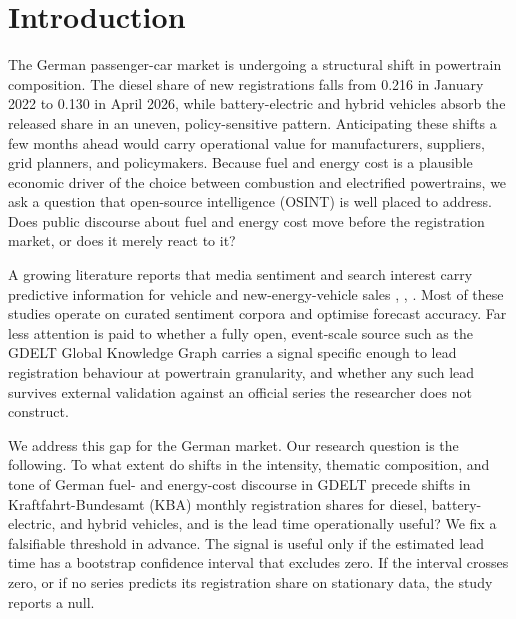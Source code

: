 \documentclass[conference]{IEEEtran}
\begin{document}
\section{Introduction}
The German passenger-car market is undergoing a structural shift in powertrain
composition. The diesel share of new registrations falls from 0.216 in January
2022 to 0.130 in April 2026, while battery-electric and hybrid vehicles absorb
the released share in an uneven, policy-sensitive pattern. Anticipating these
shifts a few months ahead would carry operational value for manufacturers,
suppliers, grid planners, and policymakers. Because fuel and energy cost is a
plausible economic driver of the choice between combustion and electrified
powertrains, we ask a question that open-source intelligence (OSINT) is well
placed to address. Does public discourse about fuel and energy cost move before
the registration market, or does it merely react to it?

A growing literature reports that media sentiment and search interest carry
predictive information for vehicle and new-energy-vehicle sales
\cite{wijnhoven2017}, \cite{shao2025}, \cite{liu2025}. Most of these studies
operate on curated sentiment corpora and optimise forecast accuracy. Far less
attention is paid to whether a fully open, event-scale source such as the GDELT
Global Knowledge Graph \cite{gdelt2013} carries a signal specific enough to lead
registration behaviour at powertrain granularity, and whether any such lead
survives external validation against an official series the researcher does not
construct.

We address this gap for the German market. Our research question is the
following. To what extent do shifts in the intensity, thematic composition, and
tone of German fuel- and energy-cost discourse in GDELT precede shifts in
Kraftfahrt-Bundesamt (KBA) monthly registration shares for diesel,
battery-electric, and hybrid vehicles, and is the lead time operationally
useful? We fix a falsifiable threshold in advance. The signal is useful only if
the estimated lead time has a bootstrap confidence interval that excludes zero.
If the interval crosses zero, or if no series predicts its registration share on
stationary data, the study reports a null.
\end{document}
